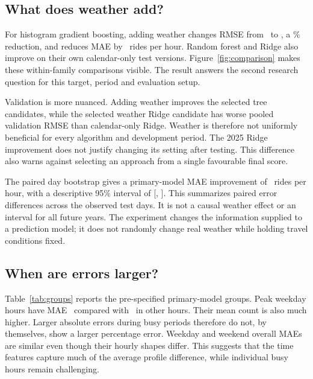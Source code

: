 \documentclass[10pt]{article}
\begin{document}
\subsection{What does weather add?}
For histogram gradient boosting, adding weather changes RMSE from \BoostTimeRMSE\ to \PrimaryRMSE, a \WeatherRMSEGain\% reduction, and reduces MAE by \WeatherMAEChange\ rides per hour. Random forest and Ridge also improve on their own calendar-only test versions. Figure~\ref{fig:comparison} makes these within-family comparisons visible. The result answers the second research question for this target, period and evaluation setup.

Validation is more nuanced. Adding weather improves the selected tree candidates, while the selected weather Ridge candidate has worse pooled validation RMSE than calendar-only Ridge. Weather is therefore not uniformly beneficial for every algorithm and development period. The 2025 Ridge improvement does not justify changing its setting after testing. This difference also warns against selecting an approach from a single favourable final score.

The paired day bootstrap gives a primary-model MAE improvement of \WeatherMAEChange\ rides per hour, with a descriptive 95\% interval of [\BootstrapLow, \BootstrapHigh]. This summarizes paired error differences across the observed test days. It is not a causal weather effect or an interval for all future years. The experiment changes the information supplied to a prediction model; it does not randomly change real weather while holding travel conditions fixed.

\subsection{When are errors larger?}
Table~\ref{tab:groups} reports the pre-specified primary-model groups. Peak weekday hours have MAE \PeakMAE\ compared with \OtherMAE\ in other hours. Their mean count is also much higher. Larger absolute errors during busy periods therefore do not, by themselves, show a larger percentage error. Weekday and weekend overall MAEs are similar even though their hourly shapes differ. This suggests that the time features capture much of the average profile difference, while individual busy hours remain challenging.

\begin{table}[!tbp]
\caption{Primary-model test errors by pre-specified groups. Categories overlap. Temperature and wet/dry groups describe the aligned ERA5 input, not station-specific conditions. Positive bias indicates overestimation.}
\label{tab:groups}
\centering

\end{table}
\end{document}

